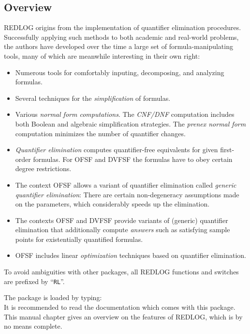 \documentclass[11pt,letterpaper]{book}
\begin{document}
\subsection{Overview}
REDLOG origins from the implementation of quantifier elimination
procedures. Successfully applying such methods to both academic and
real-world problems, the authors have developed over the time a large
set of formula-manipulating tools, many of which are meanwhile
interesting in their own right:

\begin{itemize}
\item
Numerous tools for comfortably inputing, decomposing, and analyzing
formulas.
\item
Several techniques for the \emph{simplification} of formulas.
\item
Various \emph{normal form computations}. The
\emph{\textsc{CNF}/\textsc{DNF}} computation includes both Boolean and
algebraic simplification strategies. The \emph{prenex normal form}
computation minimizes the number of quantifier changes.
\item
\emph{Quantifier elimination} computes quantifier-free equivalents for
given first-order formulas. For \textsc{OFSF} and \textsc{DVFSF} the
formulas have to obey certain degree restrictions.
\item
The context \textsc{OFSF} allows a variant of quantifier elimination
called \emph{generic quantifier elimination}: There are certain
non-degeneracy assumptions made on the parameters, which considerably
speeds up the elimination.
\item
The contexts \textsc{OFSF} and \textsc{DVFSF} provide variants of
(generic) quantifier elimination that additionally compute
\emph{answers} such as satisfying sample points for existentially
quantified formulas.
\item
\textsc{OFSF}
includes linear \emph{optimization} techniques based on quantifier
elimination.
\end{itemize}

To avoid ambiguities with other packages, all \textsc{REDLOG} functions and
switches are prefixed by ``\texttt{RL}''.

The package is loaded by typing:  \\

It is recommended to read the documentation which comes with this
package. This manual chapter gives an overview on the features of
\textsc{REDLOG}, which is by no means complete.
\end{document}
